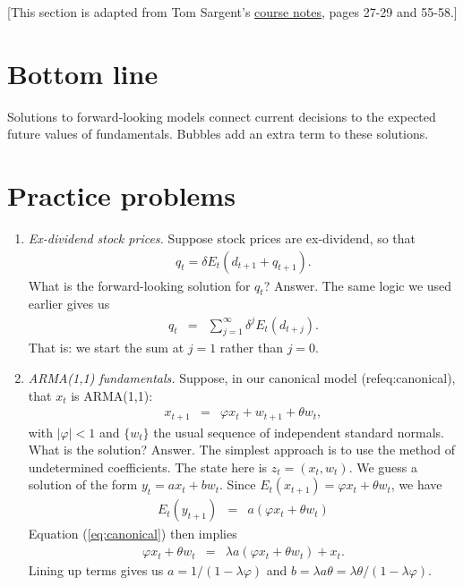 \documentclass[11pt]{article}
\begin{document}
[This section is adapted from Tom Sargent's
\href{https://files.nyu.edu/ts43/public/teaching/NYU_course_all_2011.pdf}{course notes},
pages 27-29 and 55-58.]


\section*{Bottom line}

Solutions to forward-looking models connect current decisions
to the expected future values of fundamentals.
Bubbles add an extra term to these solutions.


\section*{Practice problems}

\begin{enumerate}
\item {\it Ex-dividend stock prices.\/}
Suppose stock prices are ex-dividend, so that
\begin{eqnarray*}
    q_t = \delta E_t (d_{t+1} + q_{t+1}) .
\end{eqnarray*}
What is the forward-looking solution for $q_t$?
%
Answer. The same logic we used earlier gives us
\begin{eqnarray*}
    q_t &=&  \sum_{j=1}^\infty \delta^j E_t (d_{t+j}) .
\end{eqnarray*}
That is:  we start the sum at $j=1$ rather than $j=0$.

\item {\it ARMA(1,1) fundamentals.\/}
Suppose, in our canonical model (ref{eq:canonical}), that
$x_t$ is ARMA(1,1):
\begin{eqnarray*}
    x_{t+1} &=& \varphi x_t + w_{t+1} + \theta w_t ,
\end{eqnarray*}
with $| \varphi| < 1$ and $\{ w_t \}$ the usual sequence of independent
standard normals.
What is the solution?
%
Answer.
The simplest approach is to use the method of undetermined coefficients.
The state here is $z_t = (x_t, w_t)$.
We guess a solution of the form
$ y_t = a x_t + b w_t $.
Since $ E_t (x_{t+1}) = \varphi x_t + \theta w_t $,
we have
\begin{eqnarray*}
    E_t (y_{t+1}) &=& a (\varphi x_t + \theta w_t )
\end{eqnarray*}
Equation (\ref{eq:canonical}) then implies
\begin{eqnarray*}
    \varphi x_t + \theta w_t &=& \lambda a (\varphi x_t + \theta w_t ) + x_t .
\end{eqnarray*}
Lining up terms gives us $a = 1/(1-\lambda\varphi)$ and
$b = \lambda a \theta = \lambda \theta /(1-\lambda\varphi)$.



\end{enumerate}
\end{document}

